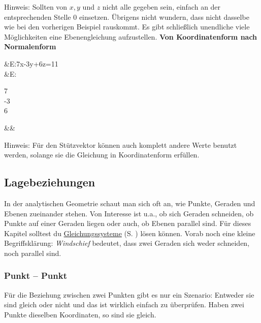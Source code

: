 \documentclass[12pt]{article}
\newcommand{\highlight}[2]{\textcolor{blue}{\hyperref[#1]{#2}} (S. \pageref{#1})}
\begin{document}
		Hinweis: Sollten von $x,y$ und $z$ nicht alle gegeben sein, einfach an der entsprechenden Stelle $0$ einsetzen. Übrigens nicht wundern, dass nicht dasselbe wie bei den vorherigen Beispiel rauskommt. Es gibt schließlich unendliche viele Möglichkeiten eine Ebenengleichung aufzustellen.\newline\newline\newline
		\textbf{Von Koordinatenform nach Normalenform}
		\begin{flalign*}
		&E:7x-3y+6z=11\\
		\Rightarrow&E:\begin{pmatrix}7\\-3\\6\end{pmatrix}\cdot{}&&
		\end{flalign*}
		Hinweis: Für den Stützvektor können auch komplett andere Werte benutzt werden, solange sie die Gleichung in Koordinatenform erfüllen.
	\subsection{Lagebeziehungen}
		In der analytischen Geometrie schaut man sich oft an, wie Punkte, Geraden und Ebenen zueinander stehen. Von Interesse ist u.a., ob sich Geraden schneiden, ob Punkte auf einer Geraden liegen oder auch, ob Ebenen parallel sind. Für dieses Kapitel solltest du \highlight{sec:gleichungssysteme}{Gleichungssysteme} lösen können. Vorab noch eine kleine Begriffsklärung: \textit{Windschief} bedeutet, dass zwei Geraden sich weder schneiden, noch parallel sind.
		\subsubsection{Punkt – Punkt}
			Für die Beziehung zwischen zwei Punkten gibt es nur ein Szenario: Entweder sie sind gleich oder nicht und das ist wirklich einfach zu überprüfen. Haben zwei Punkte dieselben Koordinaten, so sind sie gleich.
\end{document}
